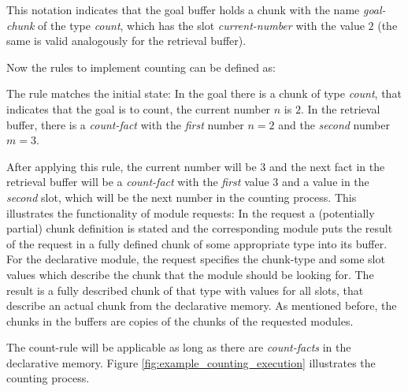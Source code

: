 This notation indicates that the goal buffer holds a chunk with the name \emph{goal-chunk} of the type \emph{count}, which has the slot \emph{current-number} with the value $2$ (the same is valid analogously for the retrieval buffer).

Now the rules to implement counting can be defined as:

\begin{center}
\end{center}

The rule matches the initial state: In the goal there is a chunk of type \emph{count}, that indicates that the goal is to count, the current number $n$ is $2$. In the retrieval buffer, there is a \emph{count-fact} with the \emph{first} number $n = 2$ and the \emph{second} number $m = 3$. 

After applying this rule, the current number will be $3$ and the next fact in the retrieval buffer will be a \emph{count-fact} with the \emph{first} value $3$ and a value in the \emph{second} slot, which will be the next number in the counting process. This illustrates the functionality of module requests: In the request a (potentially partial) chunk definition is stated and the corresponding module puts the result of the request in a fully defined chunk of some appropriate type into its buffer. For the declarative module, the request specifies the chunk-type and some slot values which describe the chunk that the module should be looking for. The result is a fully described chunk of that type with values for all slots, that describe an actual chunk from the declarative memory. As mentioned before, the chunks in the buffers are copies of the chunks of the requested modules.

The count-rule will be applicable as long as there are \emph{count-facts} in the declarative memory. Figure \ref{fig:example_counting_execution} illustrates the counting process.

